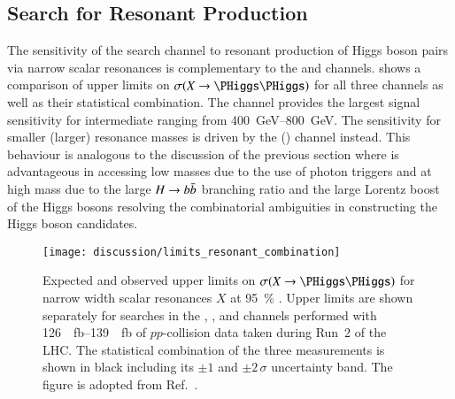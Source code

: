 

\subsection{Search for Resonant \HH Production}

The sensitivity of the \bbtautau search channel to resonant production of Higgs
boson pairs via narrow scalar resonances is complementary to the \bbyy and \bbbb
channels.  shows a comparison of upper limits
on $\sigma(X \to \HH)$ for all three channels as well as their statistical
combination. The \bbtautau channel provides the largest signal sensitivity for
intermediate \mX ranging from \SIrange{400}{800}{\GeV}. The sensitivity for
smaller (larger) resonance masses is driven by the \bbyy (\bbbb) channel
instead. This behaviour is analogous to the discussion of the previous section
where \bbyy is advantageous in accessing low masses due to the use of photon
triggers and \bbbb at high mass due to the large $H \to b\bar{b}$ branching ratio
and the large Lorentz boost of the Higgs bosons resolving the combinatorial
ambiguities in constructing the Higgs boson candidates.

\begin{figure}[htbp]
  \centering

  \texttt{[image: discussion/limits\_resonant\_combination]}

  \caption{Expected and observed upper limits on $\sigma(X \to \HH)$ for narrow
    width scalar resonances $X$ at \SI{95}{\percent} \CLs. Upper limits are
    shown separately for searches in the \bbbb, \bbtautau, and \bbyy channels
    performed with \SIrange{126}{139}{\per\femto\barn} of $pp$-collision data
    taken during Run~2 of the LHC. The statistical combination of the three
    measurements is shown in black including its $\pm 1$ and $\pm 2\,\sigma$
    uncertainty band. The figure is adopted from
    Ref.~\cite{ATLAS-CONF-2021-052}.}%
  \label{fig:resonant_hh_comb_limits}
\end{figure}


